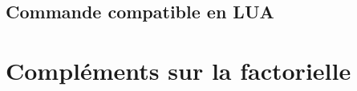 \begin{PresCodeLaTeX}{}
\end{PresCodeLaTeX}

\begin{PresCodeLaTeX}{}
\end{PresCodeLaTeX}

\begin{PresCodeLaTeX}{}
\end{PresCodeLaTeX}

\begin{PresCodeLaTeX}{}
\end{PresCodeLaTeX}

\begin{PresCodeLaTeX}{}
\end{PresCodeLaTeX}

\subsection{Commande compatible en LUA}

\begin{PresCodeLaTeX}{}
\end{PresCodeLaTeX}

\begin{PresCodeLaTeX}{}
\end{PresCodeLaTeX}

\begin{PresCodeLaTeX}{}
\end{PresCodeLaTeX}

\begin{PresCodeLaTeX}{}
\end{PresCodeLaTeX}

\begin{PresCodeLaTeX}{}
\end{PresCodeLaTeX}

\section{Compléments sur la factorielle}\label{clptfacto}

